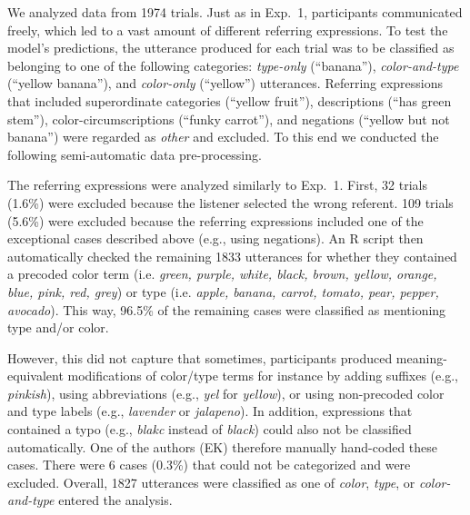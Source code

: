\documentclass[11pt]{article}
\begin{document}
We analyzed data from 1974 trials. Just as in Exp.~1, participants communicated freely, which led to a vast amount of different referring expressions. To test the model's predictions, the utterance produced for each trial was to be classified as belonging to one of the following categories: \textit{type-only} (``banana''), \textit{color-and-type} (``yellow banana''), and \textit{color-only} (``yellow'') utterances. Referring expressions that included superordinate categories (``yellow fruit''), descriptions (``has green stem''), color-circumscriptions (``funky carrot''), and negations (``yellow but not banana'') were regarded as \textit{other} and excluded. To this end we conducted the following semi-automatic data pre-processing.

The referring expressions were analyzed similarly to Exp.~1. First, 32 trials (1.6\%) were excluded because the listener selected the wrong referent. 109 trials (5.6\%) were excluded because the referring expressions included one of the exceptional cases described above (e.g., using negations). 
An R script then automatically checked the remaining 1833 utterances for whether they contained a precoded color term (i.e. \emph{green, purple, white, black, brown, yellow, orange, blue, pink, red, grey}) or type (i.e. \emph{apple, banana, carrot, tomato, pear, pepper, avocado}). This way, 96.5\% of the remaining cases were classified as mentioning type and/or color. 

However, this did not capture that sometimes, participants produced meaning-equivalent modifications of color/type terms for instance by adding suffixes (e.g., \emph{pinkish}), using abbreviations (e.g., \emph{yel} for \emph{yellow}), or using non-precoded color and type labels (e.g., \emph{lavender} or \emph{jalapeno}). In addition, expressions that contained a typo (e.g., \emph{blakc} instead of \emph{black}) could also not be classified automatically. One of the authors (EK) therefore manually hand-coded these cases.
There were 6 cases (0.3\%) that could not be categorized and were excluded.
Overall, 1827 utterances were classified as one of \emph{color}, \emph{type}, or \emph{color-and-type} entered the analysis.
\end{document}
